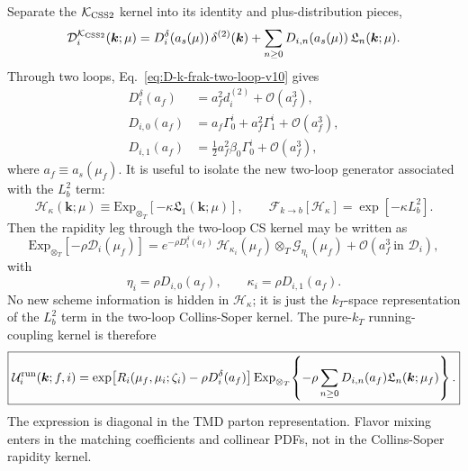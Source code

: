 \documentclass[11pt]{article}
\newcommand{\bk}{\bm{k}}
\newcommand{\deltaT}{\delta^{(2)}}
\newcommand{\ot}{\otimes_T}
\newcommand{\order}[1]{\mathcal{O}\!\left(#1\right)}
\newcommand{\ExpT}{\mathrm{Exp}_{\otimes_T}}
\newcommand{\KCSS}{\mathcal K_{\rm CSS2}}
\begin{document}
Separate the $\KCSS$ kernel into its identity and plus-distribution pieces,
\begin{equation}
  \mathcal D_i^{\KCSS}(\bk;\mu)
  =D_i^\delta(a_s(\mu))\,\deltaT(\bk)
  +\sum_{n\ge0}D_{i,n}(a_s(\mu))\,\mathfrak L_n(\bk;\mu).
  \label{eq:D-decomposition-v11}
\end{equation}
Through two loops, Eq.~\eqref{eq:D-k-frak-two-loop-v10} gives
\begin{align}
  D_i^\delta(a_f)&=a_f^2d_i^{(2)}+\order{a_f^3},
  \label{eq:D-delta-v11}
  \\
  D_{i,0}(a_f)&=a_f\Gamma_0^i+a_f^2\Gamma_1^i+\order{a_f^3},
  \label{eq:D0-v11}
  \\
  D_{i,1}(a_f)&=\frac{1}{2}a_f^2\beta_0\Gamma_0^i+\order{a_f^3},
  \label{eq:D1-v11}
\end{align}
where $a_f\equiv a_s(\mu_f)$.  It is useful to isolate the new two-loop generator
associated with the $L_b^2$ term:
\begin{equation}
  \mathcal H_\kappa(\bk;\mu)
  \equiv\ExpT\!\left[-\kappa\mathfrak L_1(\bk;\mu)\right],
  \qquad
  \mathcal F_{k\to b}[\mathcal H_\kappa]=\exp[-\kappa L_b^2].
  \label{eq:H-kappa-v11}
\end{equation}
Then the rapidity leg through the two-loop CS kernel may be written as
\begin{equation}
  \ExpT[-\rho\mathcal D_i(\mu_f)]
  =e^{-\rho D_i^\delta(a_f)}\,
  \mathcal H_{\kappa_i}(\mu_f)\ot\mathcal G_{\eta_i}(\mu_f)
  +\order{a_f^3\ \text{in }\mathcal D_i},
  \label{eq:U-rapidity-HG-v11}
\end{equation}
with
\begin{equation}
  \eta_i=\rho D_{i,0}(a_f),
  \qquad
  \kappa_i=\rho D_{i,1}(a_f).
  \label{eq:eta-kappa-v11}
\end{equation}
No new scheme information is hidden in $\mathcal H_\kappa$; it is just the $k_T$-space
representation of the $L_b^2$ term in the two-loop Collins-Soper kernel.  The pure-$k_T$
running-coupling kernel is therefore
\begin{equation}
  \boxed{
  \mathcal U_i^{\rm run}(\bk;f,i)
  =\exp\!\left[R_i(\mu_f,\mu_i;\zeta_i)-\rho D_i^\delta(a_f)\right]
  \ExpT\!\left\{-\rho\sum_{n\ge0}D_{i,n}(a_f)\mathfrak L_n(\bk;\mu_f)\right\}.}
  \label{eq:U-running-k-v11}
\end{equation}
The expression is diagonal in the TMD parton representation.  Flavor mixing enters in the
matching coefficients and collinear PDFs, not in the Collins-Soper rapidity kernel.
\end{document}
